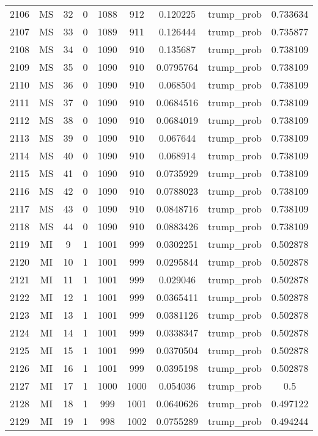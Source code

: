\documentclass[12pt,a4paper]{article}
\begin{document}
\begin{tabular}{r|cccccccc}
	2106 & MS & 32 & 0 & 1088 & 912 & 0.120225 & trump\_prob & 0.733634 \\
	2107 & MS & 33 & 0 & 1089 & 911 & 0.126444 & trump\_prob & 0.735877 \\
	2108 & MS & 34 & 0 & 1090 & 910 & 0.135687 & trump\_prob & 0.738109 \\
	2109 & MS & 35 & 0 & 1090 & 910 & 0.0795764 & trump\_prob & 0.738109 \\
	2110 & MS & 36 & 0 & 1090 & 910 & 0.068504 & trump\_prob & 0.738109 \\
	2111 & MS & 37 & 0 & 1090 & 910 & 0.0684516 & trump\_prob & 0.738109 \\
	2112 & MS & 38 & 0 & 1090 & 910 & 0.0684019 & trump\_prob & 0.738109 \\
	2113 & MS & 39 & 0 & 1090 & 910 & 0.067644 & trump\_prob & 0.738109 \\
	2114 & MS & 40 & 0 & 1090 & 910 & 0.068914 & trump\_prob & 0.738109 \\
	2115 & MS & 41 & 0 & 1090 & 910 & 0.0735929 & trump\_prob & 0.738109 \\
	2116 & MS & 42 & 0 & 1090 & 910 & 0.0788023 & trump\_prob & 0.738109 \\
	2117 & MS & 43 & 0 & 1090 & 910 & 0.0848716 & trump\_prob & 0.738109 \\
	2118 & MS & 44 & 0 & 1090 & 910 & 0.0883426 & trump\_prob & 0.738109 \\
	2119 & MI & 9 & 1 & 1001 & 999 & 0.0302251 & trump\_prob & 0.502878 \\
	2120 & MI & 10 & 1 & 1001 & 999 & 0.0295844 & trump\_prob & 0.502878 \\
	2121 & MI & 11 & 1 & 1001 & 999 & 0.029046 & trump\_prob & 0.502878 \\
	2122 & MI & 12 & 1 & 1001 & 999 & 0.0365411 & trump\_prob & 0.502878 \\
	2123 & MI & 13 & 1 & 1001 & 999 & 0.0381126 & trump\_prob & 0.502878 \\
	2124 & MI & 14 & 1 & 1001 & 999 & 0.0338347 & trump\_prob & 0.502878 \\
	2125 & MI & 15 & 1 & 1001 & 999 & 0.0370504 & trump\_prob & 0.502878 \\
	2126 & MI & 16 & 1 & 1001 & 999 & 0.0395198 & trump\_prob & 0.502878 \\
	2127 & MI & 17 & 1 & 1000 & 1000 & 0.054036 & trump\_prob & 0.5 \\
	2128 & MI & 18 & 1 & 999 & 1001 & 0.0640626 & trump\_prob & 0.497122 \\
	2129 & MI & 19 & 1 & 998 & 1002 & 0.0755289 & trump\_prob & 0.494244 \\

\end{tabular}
\end{document}
